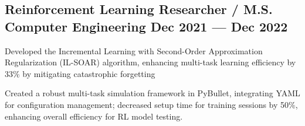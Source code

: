 \subsection{{Reinforcement Learning Researcher / M.S. Computer Engineering  \hfill Dec 2021 --- Dec 2022}}
\begin{zitemize}
	\item Developed the Incremental Learning with Second-Order Approximation Regularization (IL-SOAR) algorithm, enhancing multi-task learning efficiency by 33\% by mitigating catastrophic forgetting
	\item  Created a robust multi-task simulation framework in PyBullet, integrating YAML for configuration management; decreased setup time for training sessions by 50\%, enhancing overall efficiency for RL model testing.
\end{zitemize}

